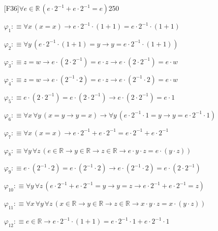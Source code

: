 \begin{fullproof}{[F36]}{$\forall e \in \mathbb{R}\,(e \cdot 2^{-1} + e \cdot 2^{-1} = e)$}{250}
\begin{ptree}
\noLine
{}
\noLine
{}
\end{ptree}
\begin{abbrevlist}
\item $\varphi_{1} :\equiv \forall x\,(x = x) \to e \cdot 2^{-1} \cdot (1 + 1) = e \cdot 2^{-1} \cdot (1 + 1)$
\item $\varphi_{2} :\equiv \forall y\,(e \cdot 2^{-1} \cdot (1 + 1) = y \to y = e \cdot 2^{-1} \cdot (1 + 1))$
\item $\varphi_{3} :\equiv z = w \to e \cdot (2 \cdot 2^{-1}) = e \cdot z \to e \cdot (2 \cdot 2^{-1}) = e \cdot w$
\item $\varphi_{4} :\equiv z = w \to e \cdot (2^{-1} \cdot 2) = e \cdot z \to e \cdot (2^{-1} \cdot 2) = e \cdot w$
\item $\varphi_{5} :\equiv e \cdot (2 \cdot 2^{-1}) = e \cdot (2 \cdot 2^{-1}) \to e \cdot (2 \cdot 2^{-1}) = e \cdot 1$
\item $\varphi_{6} :\equiv \forall x\,\forall y\,(x = y \to y = x) \to \forall y\,(e \cdot 2^{-1} \cdot 1 = y \to y = e \cdot 2^{-1} \cdot 1)$
\item $\varphi_{7} :\equiv \forall x\,(x = x) \to e \cdot 2^{-1} + e \cdot 2^{-1} = e \cdot 2^{-1} + e \cdot 2^{-1}$
\item $\varphi_{8} :\equiv \forall y\,\forall z\,(e \in \mathbb{R} \to y \in \mathbb{R} \to z \in \mathbb{R} \to e \cdot y \cdot z = e \cdot (y \cdot z))$
\item $\varphi_{9} :\equiv e \cdot (2^{-1} \cdot 2) = e \cdot (2^{-1} \cdot 2) \to e \cdot (2^{-1} \cdot 2) = e \cdot (2 \cdot 2^{-1})$
\item $\varphi_{10} :\equiv \forall y\,\forall z\,(e \cdot 2^{-1} + e \cdot 2^{-1} = y \to y = z \to e \cdot 2^{-1} + e \cdot 2^{-1} = z)$
\item $\varphi_{11} :\equiv \forall x\,\forall y\,\forall z\,(x \in \mathbb{R} \to y \in \mathbb{R} \to z \in \mathbb{R} \to x \cdot y \cdot z = x \cdot (y \cdot z))$
\item $\varphi_{12} :\equiv e \in \mathbb{R} \to e \cdot 2^{-1} \cdot (1 + 1) = e \cdot 2^{-1} \cdot 1 + e \cdot 2^{-1} \cdot 1$

\end{abbrevlist}
\end{fullproof}

